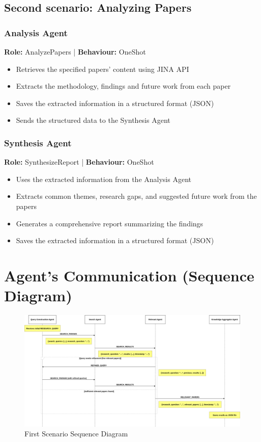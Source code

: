 \documentclass{article}
\begin{document}
\subsection{Second scenario: Analyzing Papers}

\subsubsection{Analysis Agent}

\textbf{Role:} AnalyzePapers | \textbf{Behaviour:} OneShot

\begin{itemize}
  \item Retrieves the specified papers' content using JINA API
  \item Extracts the methodology, findings and future work from each paper
  \item Saves the extracted information in a structured format (JSON)
  \item Sends the structured data to the Synthesis Agent
\end{itemize}

\subsubsection{Synthesis Agent}

\textbf{Role:} SynthesizeReport | \textbf{Behaviour:} OneShot

\begin{itemize}
  \item Uses the extracted information from the Analysis Agent
  \item Extracts common themes, research gaps, and suggested future work from the papers
  \item Generates a comprehensive report summarizing the findings
  \item Saves the extracted information in a structured format (JSON)
\end{itemize}

\section*{Agent's Communication (Sequence Diagram)}

\begin{figure}[H]
    \centering
    \includegraphics[width=\textwidth]{images/agent_communication.png}
    \caption{First Scenario Sequence Diagram}
    \label{fig:First-Scenario}
\end{figure}
\end{document}
